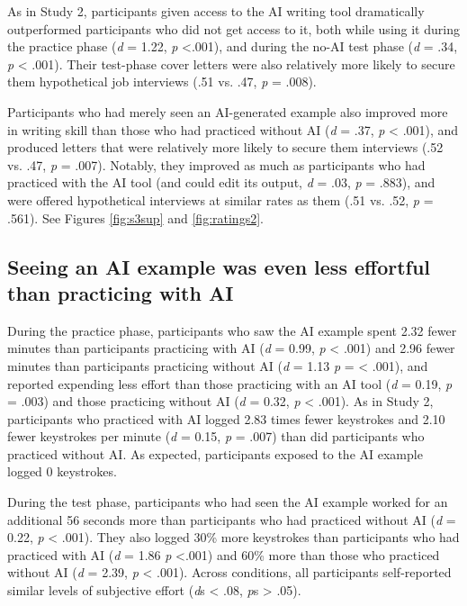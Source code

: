 \documentclass[11pt]{report}
\begin{document}
\begin{mainf}
As in Study 2, participants given access to the AI writing tool dramatically outperformed participants who did not get access to it, both while using it during the practice phase (\emph{d} = 1.22, \emph{p} \textless.001), and during the no-AI test phase (\emph{d} = .34, \emph{p}  \textless{} .001). Their test-phase cover letters were also relatively more likely to secure them hypothetical job interviews (.51 vs. .47, \textit{p} = .008).

Participants who had merely seen an AI-generated example also improved more in writing skill than those who had practiced without AI (\emph{d} = .37, \emph{p} \textless{} .001), and produced letters that were relatively more likely to secure them interviews (.52 vs. .47, \textit{p} = .007). Notably, they improved as much as participants who had practiced with the AI tool (and could edit its output, \emph{d} = .03, \emph{p} = .883), and were offered hypothetical interviews at similar rates as them (.51 vs. .52, \textit{p} = .561). See Figures \ref{fig:s3sup} and \ref{fig:ratings2}. %


\subsection*{Seeing an AI example was even less effortful than practicing
with
AI}\label{seeing-an-ai-example-was-even-less-effortful-than-practicing-with-ai}

During the practice phase, participants who saw the AI example spent 2.32 fewer minutes than participants
practicing with AI (\emph{d} = 0.99, \emph{p} \textless{}
.001) and 2.96 fewer minutes than participants practicing without AI (\emph{d} =
1.13 \emph{p} = \textless{} .001), and reported expending less effort than those practicing with an AI tool
(\emph{d} = 0.19, \emph{p} = .003) and those practicing without AI (\emph{d} = 0.32, \emph{p}
\textless{} .001).  As in Study 2, participants who practiced with AI logged 2.83 times fewer keystrokes and 2.10 fewer keystrokes per minute (\emph{d} = 0.15, \emph{p} = .007) than did participants who practiced without AI. As expected, participants exposed to the AI example logged 0 keystrokes.

During the test phase, participants who had seen the AI example worked for an additional 56 seconds more than participants who had practiced without AI (\emph{d} = 0.22, \emph{p} \textless{} .001). They also logged 30\% more keystrokes than participants who had practiced with AI (\textit{d} = 1.86 \textit{p} <.001) and 60\% more than those who practiced without AI (\textit{d} = 2.39, \textit{p} < .001). Across conditions, all participants self-reported similar levels of subjective effort (\textit{d}s < .08, \textit{p}s > .05).


\end{mainf}
\end{document}
